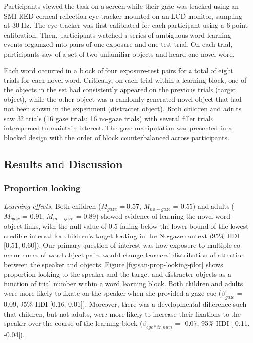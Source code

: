 \documentclass[10pt, letterpaper]{article}
\begin{document}
Participants viewed the task on a screen while their gaze was tracked
using an SMI RED corneal-reflection eye-tracker mounted on an LCD
monitor, sampling at 30 Hz. The eye-tracker was first calibrated for
each participant using a 6-point calibration. Then, participants watched
a series of ambiguous word learning events organized into pairs of one
exposure and one test trial. On each trial, participants saw of a set of
two unfamiliar objects and heard one novel word.

Each word occurred in a block of four exposure-test pairs for a total of
eight trials for each novel word. Critically, on each trial within a
learning block, one of the objects in the set had consistently appeared
on the previous trials (target object), while the other object was a
randomly generated novel object that had not been shown in the
experiment (distracter object). Both children and adults saw 32 trials
(16 gaze trials; 16 no-gaze trials) with several filler trials
interspersed to maintain interest. The gaze manipulation was presented
in a blocked design with the order of block counterbalanced across
participants.

\hypertarget{results-and-discussion-1}{%
\subsection{Results and Discussion}\label{results-and-discussion-1}}

\hypertarget{proportion-looking}{%
\subsubsection{Proportion looking}\label{proportion-looking}}

\emph{Learning effects.} Both children (\(M_{gaze}\) = 0.57,
\(M_{no-gaze}\) = 0.55) and adults (\(M_{gaze}\) = 0.91, \(M_{no-gaze}\)
= 0.89) showed evidence of learning the novel word-object links, with
the null value of 0.5 falling below the lower bound of the lowest
credible interval for children's target looking in the No-gaze context
(95\% HDI {[}0.51, 0.60{]}). Our primary question of interest was how
exposure to multiple co-occurrences of word-object pairs would change
learners' distribution of attention between the speaker and objects.
Figure \ref{fig:san-prop-looking-plot} shows proportion looking to the
speaker and the target and distracter objects as a function of trial
number within a word learning block. Both children and adults were more
likely to fixate on the speaker when she provided a gaze cue
(\(\beta_{gaze}\) = 0.09, 95\% HDI {[}0.16, 0.01{]}). Moreover, there
was a developmental difference such that children, but not adults, were
more likely to increase their fixations to the speaker over the course
of the learning block (\(\beta_{age*tr.num}\) = -0.07, 95\% HDI
{[}-0.11, -0.04{]}).
\end{document}
